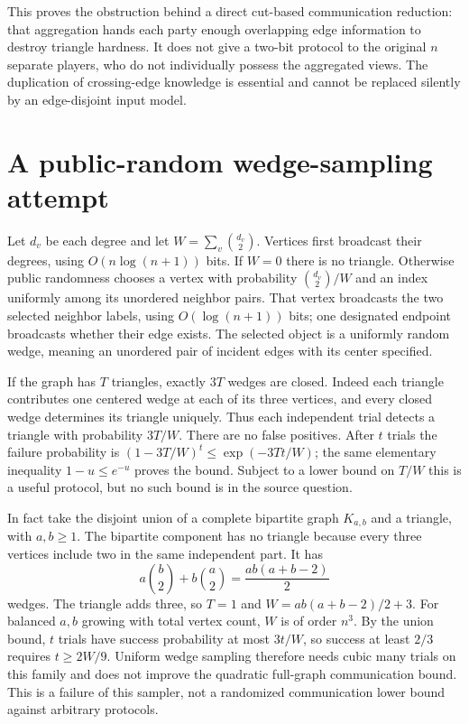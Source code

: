 \documentclass[11pt]{article}
\begin{document}
This proves the obstruction behind a direct cut-based communication
reduction: that aggregation hands each party enough overlapping edge
information to destroy triangle hardness. It does not give a two-bit
protocol to the original $n$ separate players, who do not individually
possess the aggregated views. The duplication of crossing-edge knowledge
is essential and cannot be replaced silently by an edge-disjoint input model.

\section{A public-random wedge-sampling attempt}
Let $d_v$ be each degree and let
$W=\sum_v\binom{d_v}{2}$. Vertices first broadcast their degrees, using
$O(n\log(n+1))$ bits. If $W=0$ there is no triangle. Otherwise public
randomness chooses a vertex with probability $\binom{d_v}{2}/W$ and
an index uniformly among its unordered neighbor pairs. That vertex
broadcasts the two selected neighbor labels, using $O(\log(n+1))$
bits; one designated endpoint broadcasts whether their edge exists.
The selected object is a uniformly random wedge, meaning an unordered
pair of incident edges with its center specified.

If the graph has $T$ triangles, exactly $3T$ wedges are closed. Indeed
each triangle contributes one centered wedge at each of its three
vertices, and every closed wedge determines its triangle uniquely.
Thus each independent trial detects a triangle with probability $3T/W$.
There are no false positives. After $t$ trials the failure probability
is $(1-3T/W)^t\le\exp(-3Tt/W)$; the same elementary inequality
$1-u\le e^{-u}$ proves the bound. Subject to a lower bound on $T/W$
this is a useful protocol, but no such bound is in the source question.

In fact take the disjoint union of a complete bipartite graph $K_{a,b}$
and a triangle, with $a,b\ge1$. The bipartite component has no triangle
because every three vertices include two in the same independent part.
It has
\[
a\binom b2+b\binom a2=\frac{ab(a+b-2)}2
\]
wedges. The triangle adds three, so $T=1$ and
$W=ab(a+b-2)/2+3$. For balanced $a,b$ growing with total vertex count,
$W$ is of order $n^3$. By the union bound, $t$ trials have success
probability at most $3t/W$, so success at least $2/3$ requires
$t\ge2W/9$. Uniform wedge sampling therefore needs cubic many
trials on this family and does not improve the quadratic full-graph
communication bound. This is a failure of this sampler, not a randomized
communication lower bound against arbitrary protocols.
\end{document}
